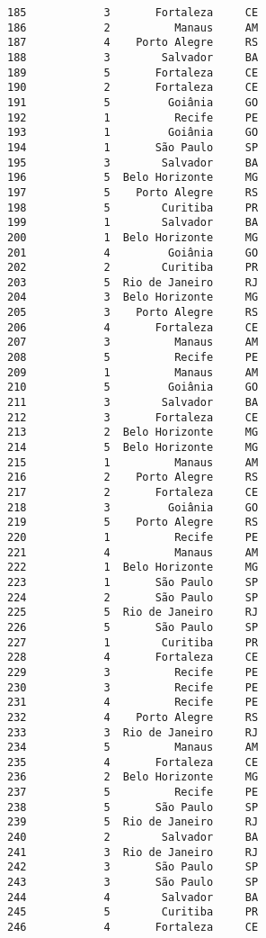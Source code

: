 \documentclass[11pt]{article}
\begin{document}
\begin{Verbatim}[commandchars=\\\{\}]
185            3       Fortaleza     CE  
186            2          Manaus     AM  
187            4    Porto Alegre     RS  
188            3        Salvador     BA  
189            5       Fortaleza     CE  
190            2       Fortaleza     CE  
191            5         Goiânia     GO  
192            1          Recife     PE  
193            1         Goiânia     GO  
194            1       São Paulo     SP  
195            3        Salvador     BA  
196            5  Belo Horizonte     MG  
197            5    Porto Alegre     RS  
198            5        Curitiba     PR  
199            1        Salvador     BA  
200            1  Belo Horizonte     MG  
201            4         Goiânia     GO  
202            2        Curitiba     PR  
203            5  Rio de Janeiro     RJ  
204            3  Belo Horizonte     MG  
205            3    Porto Alegre     RS  
206            4       Fortaleza     CE  
207            3          Manaus     AM  
208            5          Recife     PE  
209            1          Manaus     AM  
210            5         Goiânia     GO  
211            3        Salvador     BA  
212            3       Fortaleza     CE  
213            2  Belo Horizonte     MG  
214            5  Belo Horizonte     MG  
215            1          Manaus     AM  
216            2    Porto Alegre     RS  
217            2       Fortaleza     CE  
218            3         Goiânia     GO  
219            5    Porto Alegre     RS  
220            1          Recife     PE  
221            4          Manaus     AM  
222            1  Belo Horizonte     MG  
223            1       São Paulo     SP  
224            2       São Paulo     SP  
225            5  Rio de Janeiro     RJ  
226            5       São Paulo     SP  
227            1        Curitiba     PR  
228            4       Fortaleza     CE  
229            3          Recife     PE  
230            3          Recife     PE  
231            4          Recife     PE  
232            4    Porto Alegre     RS  
233            3  Rio de Janeiro     RJ  
234            5          Manaus     AM  
235            4       Fortaleza     CE  
236            2  Belo Horizonte     MG  
237            5          Recife     PE  
238            5       São Paulo     SP  
239            5  Rio de Janeiro     RJ  
240            2        Salvador     BA  
241            3  Rio de Janeiro     RJ  
242            3       São Paulo     SP  
243            3       São Paulo     SP  
244            4        Salvador     BA  
245            5        Curitiba     PR  
246            4       Fortaleza     CE  

\end{Verbatim}
\end{document}
